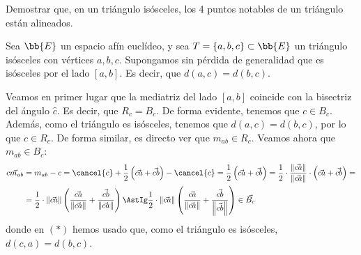 \begin{ejercicio}
    Demostrar que, en un triángulo isósceles, los 4 puntos notables de un triángulo están alineados.

    \begin{figure}[H]
        \centering
    \end{figure}

    Sea $\bb{E}$ un espacio afín euclídeo, y sea $T=\{a,b,c\}\subset \bb{E}$ un triángulo isósceles con vértices $a,b,c$.
    Supongamos sin pérdida de generalidad que es isósceles por el lado $[a,b]$. Es decir, que $d(a,c) = d(b,c)$.


    Veamos en primer lugar que la mediatriz del lado $[a,b]$ coincide con la bisectriz del ángulo $\widehat{c}$. Es decir, que $R_{c} = B_c$.
    De forma evidente, tenemos que $c\in B_c$. Además, como el triángulo es isósceles, tenemos que $d(a,c) = d(b,c)$, por lo que $c\in R_c$.
    De forma similar, es directo ver que $m_{ab}\in R_c$. Veamos ahora que $m_{ab}\in B_c$:
    \begin{align*}
        \vec{cm_{ab}} &= m_{ab} - c = \cancel{c}+\frac{1}{2}\left(\vec{ca} + \vec{cb}\right) - \cancel{c} = \frac{1}{2}\left(\vec{ca} + \vec{cb}\right)
        = \frac{1}{2} \cdot \frac{\left\|\vec{ca}\right\|}{\left\|\vec{ca}\right\|}\cdot \left(\vec{ca} + \vec{cb}\right)
        =\\&= \frac{1}{2} \cdot \left\|\vec{ca}\right\| \left(\frac{\vec{ca}}{\left\|\vec{ca}\right\|} + \frac{\vec{cb}}{\left\|\vec{ca}\right\|}\right)
        \AstIg \frac{1}{2} \cdot \left\|\vec{ca}\right\| \left(\frac{\vec{ca}}{\left\|\vec{ca}\right\|} + \frac{\vec{cb}}{\left\|\vec{cb}\right\|}\right) \in \vec{B_c}
    \end{align*}
    donde en $(\ast)$ hemos usado que, como el triángulo es isósceles, $d(c,a)=d(b,c)$.


\end{ejercicio}
